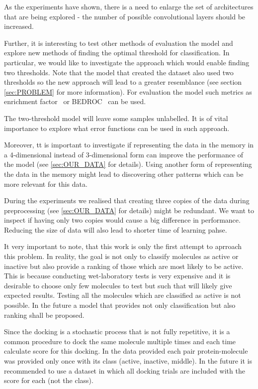 \documentclass[a4paper,10pt]{report}
\begin{document}
      As the experiments have shown, there is a need to enlarge the set of architectures that are being explored - the number of possible convolutional layers should be increased.
      
      Further, it is interesting to test other methods of evaluation the model and explore new methods of finding the optimal threshold for classification. In particular, we would like to investigate the approach which would enable finding two thresholds. Note that the model that created the dataset also used two thresholds so the new approach will lead to a greater resemblance (see section \ref{sec:PROBLEM} for more information). For evaluation the model such metrics as enrichment factor~\cite{ROC_EF, EF_BEDROC} or BEDROC~\cite{EF_BEDROC} can be used.
      
      The two-threshold model will leave some samples unlabelled. It is of vital importance to explore what error functions can be used in such approach.

      Moreover, tt is important to investigate if representing the data in the memory in a 4-dimensional instead of 3-dimensional form can improve the performance of the model (see \ref{sec:OUR_DATA} for details). Using another form of representing the data in the memory might lead to discovering other patterns which can be more relevant for this data.
      
      During the experiments we realised that creating three copies of the data during preprocessing (see \ref{sec:OUR_DATA} for details) might be redundant. We want to inspect if having only two copies would cause a big difference in performance. Reducing the size of data will also lead to shorter time of learning pahse.
      
      It very important to note, that this work is only the first attempt to aprroach this problem. In reality, the goal is not only to classify molecules as active or inactive but also provide a ranking of those which are most likely to be active. This is because conducting wet-laboratory tests is very expensive and it is desirable to choose only few molecules to test but such that will likely give expected results. Testing all the molecules which are classified as active is not possible. In the future a model that provides not only classification but also ranking shall be proposed.
      
      Since the docking is a stochastic process that is not fully repetitive, it is a common procedure to dock the same molecule multiple times and each time calculate score for this docking. In the data provided each pair protein-molecule was provided only once with its class (active, inactive, middle). In the future it is recommended to use a dataset in which all docking trials are included with the score for each (not the class).
      
\end{document}
